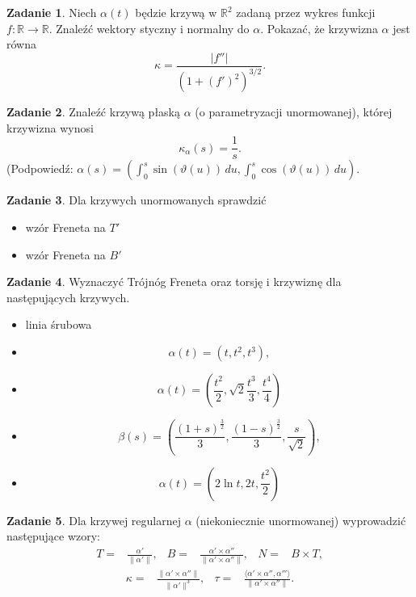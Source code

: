 \documentclass[a4paper,11pt]{article}
\theoremstyle{definition}\newtheorem{exercise}{Zadanie}
\theoremstyle{definition}\newtheorem{remark}{Uwaga}
\begin{document}
\begin{exercise}
 Niech $\alpha(t)$ będzie krzywą w $\mathbb{R}^2$ zadaną przez wykres funkcji 
$f\colon 
\mathbb{R}\to \mathbb{R}$. Znaleźć wektory styczny i normalny do $\alpha$. 
Pokazać, że krzywizna $\alpha$ jest r\'owna
\[\kappa=\frac{|f''|}{(1+(f')^2)^{3/2}}.\] 
\end{exercise}

\begin{exercise}
Znaleźć krzywą płaską $\alpha$ (o parametryzacji unormowanej), której krzywizna 
wynosi \[\kappa_\alpha(s)=\frac{1}{s}.\]
\footnotesize{(Podpowiedź: 
$\alpha(s)=(\int_0^s\sin(\vartheta(u))\,du,\int_0^s\cos(\vartheta(u))\,du)$.}
\end{exercise}

\begin{exercise}
Dla krzywych unormowanych sprawdzić 
\begin{itemize}
 \item wz\'or Freneta na $T'$ 
 \item wz\'or Freneta na $B'$ 
\end{itemize}

\end{exercise}

\begin{exercise}
Wyznaczyć Tr\'ojn\'og Freneta oraz torsję i krzywiznę dla następujących 
krzywych.
\begin{itemize}
 \item linia śrubowa
\item 
\[\alpha(t)=(t,t^2,t^3),\]
\item 
\[\alpha(t)=\left(\frac{t^2}{2},\sqrt{2}\frac{t^3}{3},\frac{t^4}{4}\right)\]
\item 
\[\beta(s)=\left(\frac{(1+s)^{\frac{3}{2}}}{3},\frac{(1-s)^{\frac{3}
{ 2}}}{3},
\frac{s}{\sqrt{2}}\right),\]
\item \[\alpha(t)=\left(2\ln t,2t,\frac{t^2}{2}\right)\]

\end{itemize}

\end{exercise}

\begin{exercise}
Dla krzywej regularnej $\alpha$ (niekoniecznie unormowanej) wyprowadzić 
następujące wzory:
\begin{align*}
 T=& \frac{\alpha'}{\|\alpha'\|},& 
B=& \frac{\alpha'\times \alpha''}{\|\alpha'\times 
\alpha''\|}, & N=& B\times T,
\end{align*}
\begin{align*}
\kappa=&\frac{\|\alpha'\times \alpha''\|}{\|\alpha'\|^{3}}, & 
\tau=&\frac{\langle \alpha'\times 
\alpha'',\alpha'''\rangle}{\|\alpha'\times \alpha''\|}.
\end{align*}
\end{exercise}
\end{document}
